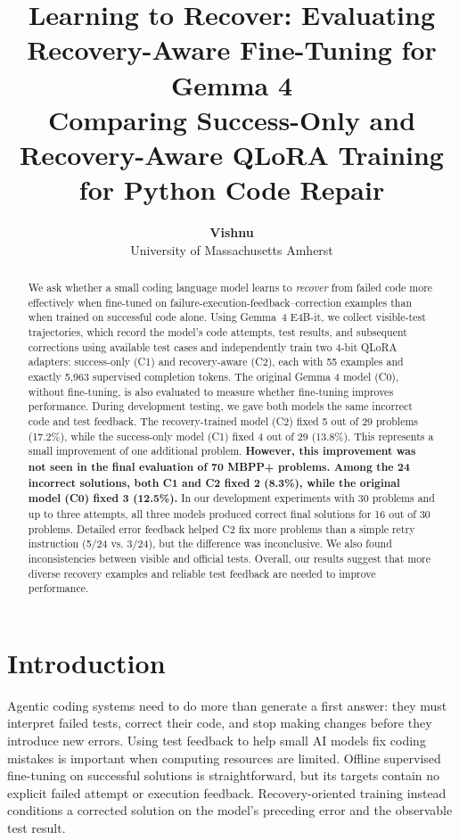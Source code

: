 \documentclass[10pt,twocolumn]{article}
\title{\vspace{-1.2em}\textbf{Learning to Recover: Evaluating Recovery-Aware Fine-Tuning for Gemma 4}\\[.55em]
\large Comparing Success-Only and Recovery-Aware QLoRA Training for Python Code Repair}
\author{{\textbf{Vishnu}} \\[-.1em] \small University of Massachusetts Amherst}
\newcommand{\gmodel}{Gemma~4 E4B-it}
\newcommand{\mbppplus}{MBPP+}
\begin{document}
\maketitle
\vspace{-1.2em}
\begin{abstract}
We ask whether a small coding language model learns to \emph{recover} from failed code more effectively when fine-tuned on failure-execution-feedback--correction examples than when trained on successful code alone. Using \gmodel{}, we collect visible-test trajectories, which record the model's code attempts, test results, and subsequent corrections using available test cases and independently train two 4-bit QLoRA adapters: success-only (C1) and recovery-aware (C2), each with 55 examples and exactly 5,963 supervised completion tokens. The original Gemma 4 model (C0), without fine-tuning, is also evaluated to measure whether fine-tuning improves performance. During development testing, we gave both models the same incorrect code and test feedback. The recovery-trained model (C2) fixed 5 out of 29 problems (17.2\%), while the success-only model (C1) fixed 4 out of 29 (13.8\%). This represents a small improvement of one additional problem. \textbf{However, this improvement was not seen in the final evaluation of 70 \mbppplus{} problems. Among the 24 incorrect solutions, both C1 and C2 fixed 2 (8.3\%), while the original model (C0) fixed 3 (12.5\%).} In our development experiments with 30 problems and up to three attempts, all three models produced correct final solutions for 16 out of 30 problems. Detailed error feedback helped C2 fix more problems than a simple retry instruction (5/24 vs. 3/24), but the difference was inconclusive. We also found inconsistencies between visible and official tests. Overall, our results suggest that more diverse recovery examples and reliable test feedback are needed to improve performance.
\end{abstract}

\section{Introduction}
Agentic coding systems need to do more than generate a first answer: they must interpret failed tests, correct their code, and stop making changes before they introduce new errors. Using test feedback to help small AI models fix coding mistakes is important when computing resources are limited. Offline supervised fine-tuning on successful solutions is straightforward, but its targets contain no explicit failed attempt or execution feedback. Recovery-oriented training instead conditions a corrected solution on the model's preceding error and the observable test result.
\end{document}
